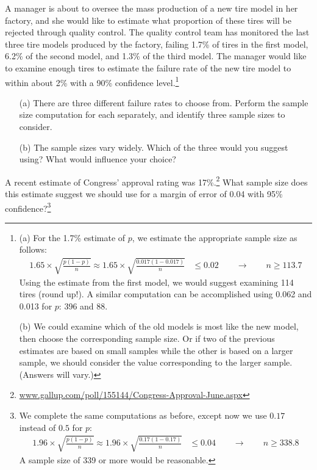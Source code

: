\begin{exercise}
A manager is about to oversee the mass production of a new tire model in her factory, and she would like to estimate what proportion of these tires will be rejected through quality control. The quality control team has monitored the last three tire models produced by the factory, failing 1.7\% of tires in the first model, 6.2\% of the second model, and 1.3\% of the third model. The manager would like to examine enough tires to estimate the failure rate of the new tire model to within about 2\% with a 90\% confidence level.\footnote{(a) For the 1.7\% estimate of $p$, we estimate the appropriate sample size as follows:
\begin{align*}
1.65\times \sqrt{\frac{p(1-p)}{n}} \approx
1.65\times \sqrt{\frac{0.017(1-0.017)}{n}} &\leq 0.02 \qquad\to\qquad n \geq 113.7
\end{align*}
Using the estimate from the first model, we would suggest examining 114 tires (round up!). A similar computation can be accomplished using 0.062 and 0.013 for $p$: 396 and 88. \par
(b) We could examine which of the old models is most like the new model, then choose the corresponding sample size. Or if two of the previous estimates are based on small samples while the other is based on a larger sample, we should consider the value corresponding to the larger sample. (Answers will vary.)}
\begin{itemize}
\setlength{\itemsep}{0mm}
\item[(a)] There are three different failure rates to choose from. Perform the sample size computation for each separately, and identify three sample sizes to consider.
\item[(b)] The sample sizes vary widely. Which of the three would you suggest using? What would influence your choice?
\end{itemize}
\end{exercise}


\begin{exercise}
A recent estimate of Congress' approval rating was 17\%.\footnote{\href{http://www.gallup.com/poll/155144/Congress-Approval-June.aspx}{www.gallup.com/poll/155144/Congress-Approval-June.aspx}} What sample size does this estimate suggest we should use for a margin of error of 0.04 with 95\% confidence?\footnote{We complete the same computations as before, except now we use $0.17$ instead of $0.5$ for $p$:
\begin{align*}
1.96\times \sqrt{\frac{p(1-p)}{n}} \approx
1.96\times \sqrt{\frac{0.17(1-0.17)}{n}} &\leq 0.04 \qquad\to\qquad n \geq 338.8
\end{align*}
A sample size of 339 or more would be reasonable.}


\end{exercise}


